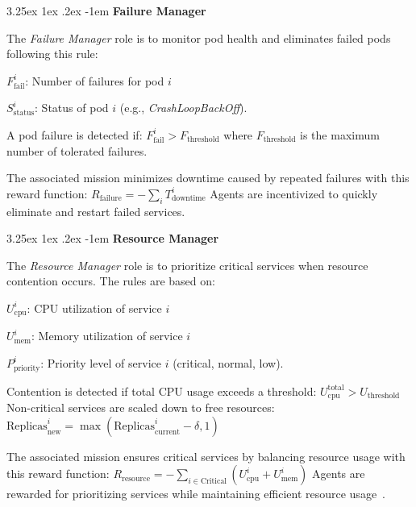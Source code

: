 \documentclass[conference]{IEEEtran}
\makeatletter
\renewcommand\paragraph{\@startsection{paragraph}{5}{\z@}%
  {3.25ex \@plus1ex \@minus.2ex}%
  {-1em}%
  {\normalfont\normalsize\bfseries}}
\makeatother
\begin{document}
\noindent \paragraph{\textbf{Failure Manager}}

The \textit{Failure Manager} role is to monitor pod health and eliminates failed pods following this rule:
\begin{enumerate*}[label={}, itemjoin={;\quad }]
    \item \( F_{\text{fail}}^i \): Number of failures for pod \( i \)
    \item \( S_{\text{status}}^i \): Status of pod \( i \) (e.g., \textit{CrashLoopBackOff}).
\end{enumerate*}
A pod failure is detected if:
$F_{\text{fail}}^i > F_{\text{threshold}}$
where \( F_{\text{threshold}} \) is the maximum number of tolerated failures.

The associated mission minimizes downtime caused by repeated failures with this reward function:
$R_{\text{failure}} = - \sum_{i} T_{\text{downtime}}^i$
Agents are incentivized to quickly eliminate and restart failed services.

\noindent \paragraph{\textbf{Resource Manager}}

The \textit{Resource Manager} role is to prioritize critical services when resource contention occurs. The rules are based on:
\begin{enumerate*}[label={}, itemjoin={;\quad }]
    \item \( U_{\text{cpu}}^i \): CPU utilization of service \( i \)
    \item \( U_{\text{mem}}^i \): Memory utilization of service \( i \)
    \item \( P_{\text{priority}}^i \): Priority level of service \( i \) (critical, normal, low).
\end{enumerate*}
Contention is detected if total CPU usage exceeds a threshold:
$U_{\text{cpu}}^{\text{total}} > U_{\text{threshold}}$
Non-critical services are scaled down to free resources:
$\text{Replicas}_{\text{new}}^i = \max\left( \text{Replicas}_{\text{current}}^i - \delta, 1 \right)$

The associated mission ensures critical services by balancing resource usage with this reward function:
$R_{\text{resource}} = - \sum_{i \in \text{Critical}} \left( U_{\text{cpu}}^i + U_{\text{mem}}^i \right)$
Agents are rewarded for prioritizing services while maintaining efficient resource usage~\cite{shahrad2020resource}.
\end{document}
